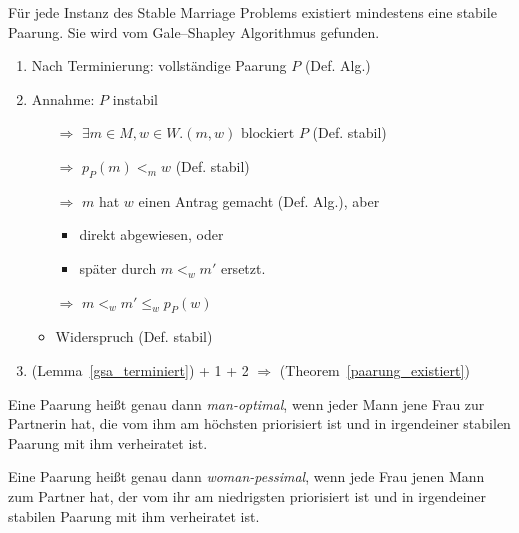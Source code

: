 \begin{frame}
  \begin{Theorem}
  \label{paarung_existiert}
    Für jede Instanz des Stable Marriage Problems existiert mindestens eine stabile Paarung. Sie wird vom Gale–Shapley Algorithmus gefunden.
  \end{Theorem}

  \begin{Beweis}
  \label{paarung_existiert_bew}
    \begin{enumerate} [<+->]
        \item Nach Terminierung: vollständige Paarung $P$ (Def. Alg.)
        \item Annahme: $P$ instabil
        \begin{itemize}
            \item[$\Longrightarrow$] $\exists m \in M,w \in W. (m,w) \textrm{ blockiert } P$ (Def. stabil)
            \item[$\Longrightarrow$] $p_{P}(m) <_{m} w$ (Def. stabil)
            \item[$\Longrightarrow$] $m$ hat $w$ einen Antrag gemacht (Def. Alg.), aber
            \begin{itemize}
                \item direkt abgewiesen, oder
                \item später durch $m <_{w} m'$ ersetzt.
            \end{itemize}
            \item[$\Longrightarrow$] $m <_{w} m' \leq_{w} p_{P}(w)$
            \item Widerspruch (Def. stabil)
        \end{itemize}
        \item (Lemma~\ref{gsa_terminiert}) + 1 + 2 $\Longrightarrow$ (Theorem~\ref{paarung_existiert})
     \end{enumerate}
  \end{Beweis}
\end{frame}

\begin{frame}
  \begin{Definition}
  \label{man_optimal}
    Eine Paarung heißt genau dann \textit{man-optimal}, wenn jeder Mann jene Frau zur Partnerin hat, die vom ihm am höchsten priorisiert ist und in irgendeiner stabilen Paarung mit ihm verheiratet ist.
  \end{Definition}

  \begin{Definition}
  \label{woman_pessimal}
    Eine Paarung heißt genau dann \textit{woman-pessimal}, wenn jede Frau jenen Mann zum Partner hat, der vom ihr am niedrigsten priorisiert ist und in irgendeiner stabilen Paarung mit ihm verheiratet ist.
  \end{Definition}
\end{frame}

